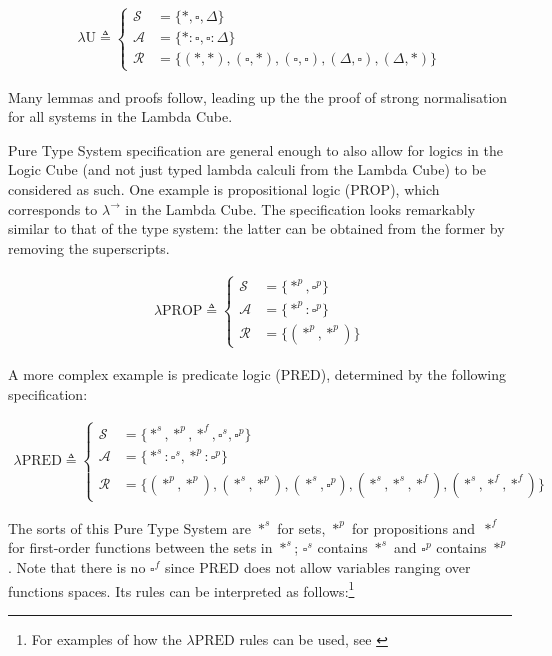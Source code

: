 \documentclass[12pt,toc=bibliography,numbers=noendperiod,
               footnotes=multiple,twoside]{scrartcl}
\begin{document}
\begin{align*}
\lambda\textrm{U} \triangleq
    \begin{cases}
        \mathcal{S} &= \{*,\square,\Delta\} \\
        \mathcal{A} &= \{*:\square,\square:\Delta\} \\
        \mathcal{R} &= \{(*,*),(\square,*),(\square,\square),(\Delta,\square),(\Delta,*)\}
    \end{cases}
\end{align*}

Many lemmas and proofs follow, leading up the the proof of strong normalisation for all systems in the Lambda Cube.

Pure Type System specification are general enough to also allow for logics in the Logic Cube (and not just typed lambda calculi from the Lambda Cube) to be considered as such. One example is propositional logic (PROP), which corresponds to \(\lambda^{\rightarrow}\) in the Lambda Cube. The specification looks remarkably similar to that of the type system: the latter can be obtained from the former by removing the superscripts.

\begin{align*}
\lambda\textrm{PROP} \triangleq
    \begin{cases}
        \mathcal{S} &= \{*^p,\square^p\} \\
        \mathcal{A} &= \{*^p:\square^p\} \\
        \mathcal{R} &= \{(*^p,*^p)\}
    \end{cases}
\end{align*}

A more complex example is predicate logic (PRED), determined by the following specification:

\begin{align*}
\lambda\textrm{PRED} \triangleq
    \begin{cases}
        \mathcal{S} &= \{*^s,*^p,*^f,\square^s,\square^p\} \\
        \mathcal{A} &= \{*^s:\square^s,*^p:\square^p\} \\
        \mathcal{R} &= \{(*^p,*^p),(*^s,*^p),(*^s,\square^p),(*^s,*^s,*^f),(*^s,*^f,*^f)\}
    \end{cases}
\end{align*}

The sorts of this Pure Type System are \(*^s\) for sets, \(*^p\) for propositions and~\(*^f\) for first-order functions between the sets in \(*^s\); \(\square^s\) contains \(*^s\) and \(\square^p\) contains \(*^p\). Note that there is no \(\square^f\) since PRED does not allow variables ranging over functions spaces. Its rules can be interpreted as follows:\footnote{For examples of how the \(\lambda\textrm{PRED}\) rules can be used, see \textcite[255]{barendregt_lambda_1992}}
\end{document}
